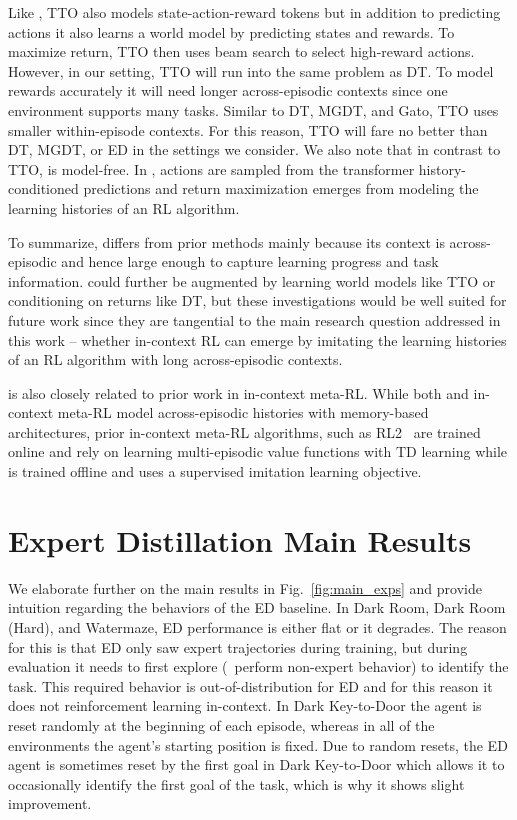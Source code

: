  Like \namenospace, TTO also models state-action-reward tokens but in addition to predicting actions it also learns a world model by predicting states and rewards. To maximize return, TTO then uses beam search to select high-reward actions. However, in our setting, TTO will run into the same problem as DT. To model rewards accurately it will need longer across-episodic contexts since one environment supports many tasks. Similar to DT, MGDT, and Gato, TTO uses smaller within-episode contexts. For this reason, TTO will fare no better than DT, MGDT, or ED in the settings we consider. We also note that in contrast to TTO, \name is model-free. In \namenospace, actions are sampled from the transformer history-conditioned predictions and return maximization emerges from modeling the learning histories of an RL algorithm.

To summarize, \name differs from prior methods mainly because its context is across-episodic and hence large enough to capture learning progress and task information. \name could further be augmented by learning world models like TTO or conditioning on returns like DT, but these investigations would be well suited for future work since they are tangential to the main research question addressed in this work -- whether in-context RL can emerge by imitating the learning histories of an RL algorithm with long across-episodic contexts. %

\name is also closely related to prior work in in-context meta-RL. While both \name and in-context meta-RL model across-episodic histories with memory-based architectures, prior in-context meta-RL algorithms, such as RL2~\citep{duan2016rl2} are trained online and rely on learning multi-episodic value functions with TD learning while \name is trained offline and uses a supervised imitation learning objective. 

\section{Expert Distillation Main Results}

We elaborate further on the main results in Fig.~\ref{fig:main_exps} and provide intuition regarding the behaviors of the ED baseline.  In Dark Room, Dark Room (Hard), and Watermaze, ED performance is either flat or it degrades. The reason for this is that ED only saw expert trajectories during training, but during evaluation it needs to first explore (\ie \, perform non-expert behavior) to identify the task. This required behavior is out-of-distribution for ED and for this reason it does not reinforcement learning in-context. In Dark Key-to-Door the agent is reset randomly at the beginning of each episode, whereas in all of the environments the agent's starting position is fixed. Due to random resets, the ED agent is sometimes reset by the first goal in Dark Key-to-Door which allows it to occasionally identify the first goal of the task, which is why it shows slight improvement.


